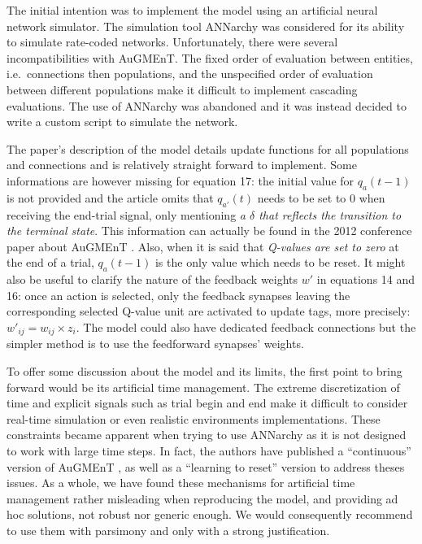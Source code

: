 \documentclass[10pt,a4paper,onecolumn]{article}
\begin{document}
The initial intention was to implement the model using an artificial
neural network simulator. The simulation tool ANNarchy
\autocite{vitay:2015} was considered for its ability to simulate
rate-coded networks. Unfortunately, there were several incompatibilities
with AuGMEnT. The fixed order of evaluation between entities,
i.e.~connections then populations, and the unspecified order of
evaluation between different populations make it difficult to implement
cascading evaluations. The use of ANNarchy was abandoned and it was
instead decided to write a custom script to simulate the network.

The paper's description of the model details update functions for all
populations and connections and is relatively straight forward to
implement. Some informations are however missing for equation 17: the
initial value for \(q_{a}(t - 1)\) is not provided and the article omits
that \(q_{a'}(t)\) needs to be set to 0 when receiving the end-trial
signal, only mentioning \emph{a \(\delta\) that reflects the transition
to the terminal state}. This information can actually be found in the
2012 conference paper about AuGMEnT \autocite{rombouts:2012}. Also, when
it is said that \emph{Q-values are set to zero} at the end of a trial,
\(q_{a}(t - 1)\) is the only value which needs to be reset. It might
also be useful to clarify the nature of the feedback weights \(w'\) in
equations 14 and 16: once an action is selected, only the feedback
synapses leaving the corresponding selected Q-value unit are activated
to update tags, more precisely: \(w'_{ij} = w_{ij} \times z_{i}\). The
model could also have dedicated feedback connections but the simpler
method is to use the feedforward synapses' weights.

To offer some discussion about the model and its limits, the first point
to bring forward would be its artificial time management. The extreme
discretization of time and explicit signals such as trial begin and end
make it difficult to consider real-time simulation or even realistic
environments implementations. These constraints became apparent when
trying to use ANNarchy as it is not designed to work with large time
steps. In fact, the authors have published a ``continuous'' version of
AuGMEnT \autocite{zambrano:2015}, as well as a ``learning to reset''
version \autocite{rombouts:2014} to address theses issues. As a whole,
we have found these mechanisms for artificial time management rather
misleading when reproducing the model, and providing ad hoc solutions,
not robust nor generic enough. We would consequently recommend to use
them with parsimony and only with a strong justification.
\end{document}
